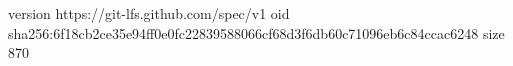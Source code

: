 version https://git-lfs.github.com/spec/v1
oid sha256:6f18cb2ce35e94ff0e0fc22839588066cf68d3f6db60c71096eb6c84ccac6248
size 870
